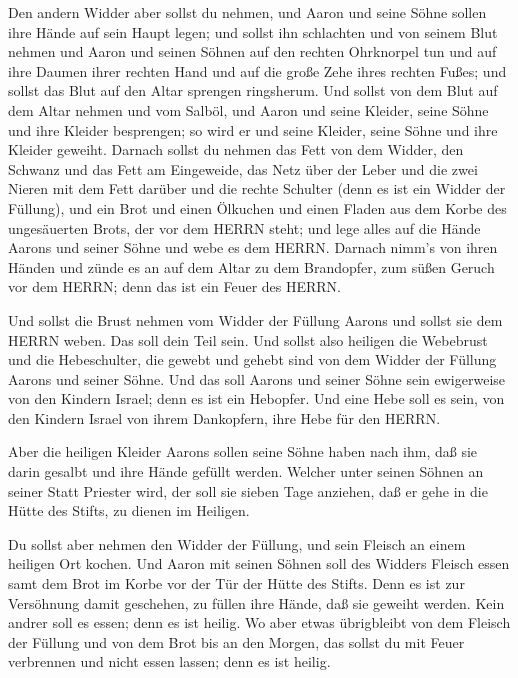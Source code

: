  Den andern Widder aber sollst du nehmen, und Aaron und
seine Söhne sollen ihre Hände auf sein Haupt legen;  und
sollst ihn schlachten und von seinem Blut nehmen und Aaron und seinen
Söhnen auf den rechten Ohrknorpel tun und auf ihre Daumen ihrer rechten
Hand und auf die große Zehe ihres rechten Fußes; und sollst das Blut auf
den Altar sprengen ringsherum.  Und sollst von dem Blut auf
dem Altar nehmen und vom Salböl, und Aaron und seine Kleider, seine
Söhne und ihre Kleider besprengen; so wird er und seine Kleider, seine
Söhne und ihre Kleider geweiht.  Darnach sollst du nehmen
das Fett von dem Widder, den Schwanz und das Fett am Eingeweide, das
Netz über der Leber und die zwei Nieren mit dem Fett darüber und die
rechte Schulter (denn es ist ein Widder der Füllung),  und
ein Brot und einen Ölkuchen und einen Fladen aus dem Korbe des
ungesäuerten Brots, der vor dem HERRN steht;  und lege
alles auf die Hände Aarons und seiner Söhne und webe es dem HERRN.
 Darnach nimm's von ihren Händen und zünde es an auf dem
Altar zu dem Brandopfer, zum süßen Geruch vor dem HERRN; denn das ist
ein Feuer des HERRN.

 Und sollst die Brust nehmen vom Widder der Füllung Aarons
und sollst sie dem HERRN weben. Das soll dein Teil sein. 
Und sollst also heiligen die Webebrust und die Hebeschulter, die gewebt
und gehebt sind von dem Widder der Füllung Aarons und seiner Söhne.
 Und das soll Aarons und seiner Söhne sein ewigerweise von
den Kindern Israel; denn es ist ein Hebopfer. Und eine Hebe soll es
sein, von den Kindern Israel von ihrem Dankopfern, ihre Hebe für den
HERRN.

 Aber die heiligen Kleider Aarons sollen seine Söhne haben
nach ihm, daß sie darin gesalbt und ihre Hände gefüllt werden.
 Welcher unter seinen Söhnen an seiner Statt Priester wird,
der soll sie sieben Tage anziehen, daß er gehe in die Hütte des Stifts,
zu dienen im Heiligen.

 Du sollst aber nehmen den Widder der Füllung, und sein
Fleisch an einem heiligen Ort kochen.  Und Aaron mit seinen
Söhnen soll des Widders Fleisch essen samt dem Brot im Korbe vor der Tür
der Hütte des Stifts.  Denn es ist zur Versöhnung damit
geschehen, zu füllen ihre Hände, daß sie geweiht werden. Kein andrer
soll es essen; denn es ist heilig.  Wo aber etwas
übrigbleibt von dem Fleisch der Füllung und von dem Brot bis an den
Morgen, das sollst du mit Feuer verbrennen und nicht essen lassen; denn
es ist heilig.

